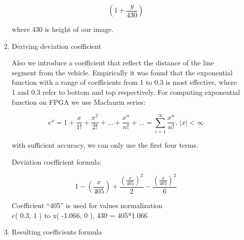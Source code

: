 \documentclass[a4paper,12pt]{article} %
\begin{document}
\begin{enumerate}
\begin{enumerate}
		\hspace{0.1cm}

		\begin{equation}
			\left (
			1 + \frac{y}{430}
			\right )
		\end{equation}

		\begin{flushright}
			\footnotesize where 430 is height of our image.
		\end{flushright}

		\newpage

		\item Deriving deviation coefficient
		
		Also we introduce a coefficient that reflect the distance of the line segment from the vehicle. Empirically it was found that the exponential function with a range of coefficients from 1 to 0.3 is most effective, where 1 and 0.3 refer to bottom and top respectively. For computing exponential function on FPGA we use Maclaurin series:


		\begin{equation}
			e^x = 1 + \frac{x}{1!} + \frac{x^2}{2!} + \ldots + \frac{x^n}{n!} + \ldots = \sum\limits_{i=1}^{\infty} \frac{x^n}{n!} \text{, } |x| < \infty
		\end{equation}

		with sufficient accuracy, we can only use the first four terms.
		
		Deviation coefficient formula:

		\begin{equation}
			1 - \left ( \frac{x}{405}\right) + 
			\frac{\left ( \frac{x}{405}\right) ^2}{2}  -
			\frac{\left ( \frac{x}{405}\right)^3}{6}
		\end{equation}

		\begin{flushright}
			\footnotesize Coefficient “405” is used for values normalization \\
			$e$( 0.3, 1 ) to x( -1.066, 0 ), 430 = 405*1.066
		\end{flushright}
		\vspace{1cm}
		
		\item Resulting coefficients formula
		

\end{enumerate}
\end{enumerate}
\end{document}
